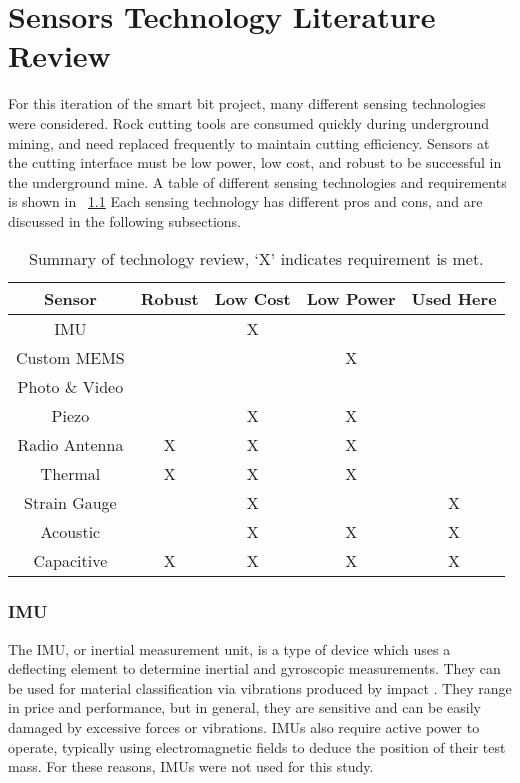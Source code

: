 \chapter{Sensors Technology Literature Review\label{chap:3}}

For this iteration of the smart bit project, many different sensing technologies were considered.
Rock cutting tools are consumed quickly during underground mining, and need replaced frequently
to maintain cutting efficiency. 
Sensors at the cutting interface must be low power, low cost, and robust 
to be successful in the underground mine.
A table of different sensing technologies and requirements is shown in ~\ref{tab:sense_review}
Each sensing technology has different pros and cons, and are discussed in the following subsections.


\begin{table}[]
\centering
\caption{Summary of technology review, `X' indicates requirement is met.}
\label{tab:sense_review}
\begin{tabular}{|c|c|c|c|c|}
\hline
Sensor         & Robust & Low Cost & Low Power & Used Here \\ \hline
IMU            &        & X        &           &           \\ \hline
Custom MEMS    &        &          & X         &           \\ \hline
Photo \& Video &        &          &           &           \\ \hline
Piezo          &        & X        & X         &           \\ \hline
Radio Antenna  & X      & X        & X         &           \\ \hline
Thermal        & X      & X        & X         &           \\ \hline
Strain Gauge   &        & X        &           & X         \\ \hline
Acoustic       &        & X        & X         & X         \\ \hline
Capacitive     & X      & X        & X         & X         \\ \hline
\end{tabular}
\end{table}

\subsection{IMU}
The IMU, or inertial measurement unit, is a type of device which uses a deflecting element
to determine inertial and gyroscopic measurements. 
They can be used for material classification via vibrations produced by impact \cite{9981139}.
They range in price and performance, but
in general, they are sensitive and can be easily damaged by excessive forces or vibrations.
IMUs also require active power to operate, typically using electromagnetic fields to deduce the 
position of their test mass. For these reasons, IMUs were not used for this study.


